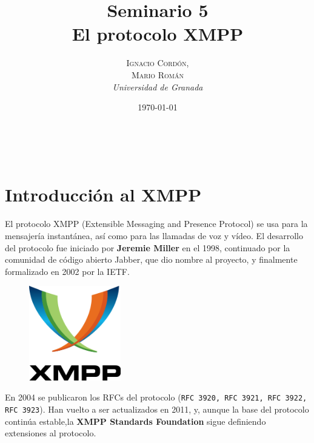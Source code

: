 \documentclass[a4paper, 11pt]{article} %
\title{\textbf{Seminario 5}\\ %
El protocolo XMPP} %
\author{\textsc{Ignacio Cordón,\\Mario Román} %
\\{\textit{Universidad de Granada}}} %
\date{\today} %
\makeatletter
\renewcommand{\maketitle}{ %
  \begin{flushright} %
    {\LARGE\@title} %
    
    \vspace{50pt} %
    
    {\large\@author} %
    \\\@date %
    
    \vspace{40pt} %
  \end{flushright}
}
\makeatother
\begin{document}
\maketitle %



\renewcommand{\abstractname}{Resumen} %
\begin{abstract}
\end{abstract}
{\parskip=2pt
\tableofcontents
}
\pagebreak



\section{Introducción al XMPP}
  El protocolo XMPP (Extensible Messaging and Presence Protocol) se usa para la 
  mensajería instantánea, así como para las llamadas de voz y vídeo. El desarrollo
  del protocolo fue iniciado por \textbf{Jeremie Miller} en el 1998, continuado 
  por la comunidad de código abierto Jabber, que dio nombre al proyecto, y finalmente
  formalizado en 2002 por la IETF.\\
  
  \begin{figure}
  \includegraphics[width=4cm]{logo.png}
  \end{figure}
  
  En 2004 se publicaron los RFCs del protocolo (\texttt{RFC 3920, RFC 3921, RFC
  3922, RFC 3923}). Han vuelto a ser actualizados en 2011, y, aunque la base 
  del protocolo continúa estable,la \textbf{XMPP Standards Foundation} sigue 
  definiendo extensiones al protocolo.
  
\end{document}
